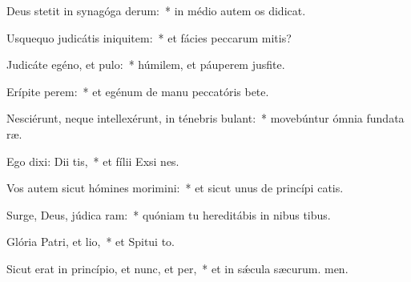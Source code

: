 \item Deus stetit in synagóga derum:~* in médio autem os didicat.
\item Usquequo judicátis iniquitem:~* et fácies peccarum mitis?
\item Judicáte egéno, et pulo:~* húmilem, et páuperem jusfite.
\item Erípite perem:~* et egénum de manu peccatóris bete.
\item Nesciérunt, neque intellexérunt, in ténebris bulant:~* movebúntur ómnia fundata ræ.
\item Ego dixi: Dii tis,~* et fílii Exsi nes.
\item Vos autem sicut hómines morimini:~* et sicut unus de princípi catis.
\item Surge, Deus, júdica ram:~* quóniam tu hereditábis in nibus tibus.
\item Glória Patri, et lio,~* et Spitui to.
\item Sicut erat in princípio, et nunc, et per,~* et in sǽcula sæcurum. men.
